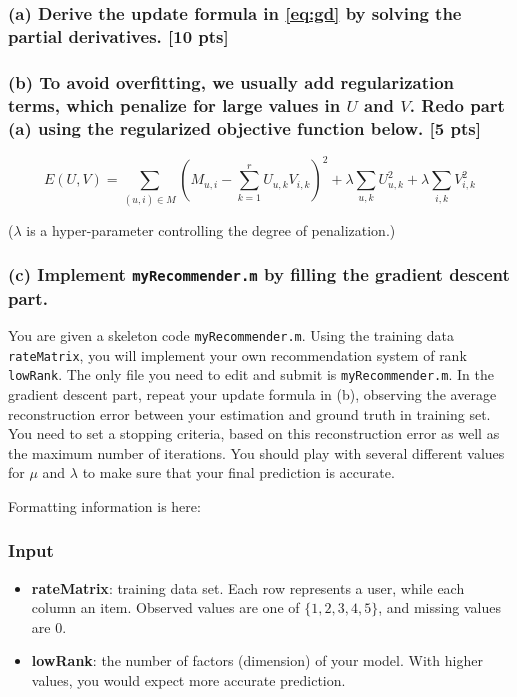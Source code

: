 \documentclass[twoside,10pt]{article}
\begin{document}
\subsubsection*{(a) Derive the update formula in \eqref{eq:gd} by
solving the partial derivatives. [10 pts]}

\subsubsection*{(b) To avoid overfitting, we usually add regularization terms, which penalize for large values in $U$ and $V$.
Redo part (a) using the regularized objective function below. [5
pts]}

\begin{equation}
E(U,V) = \sum_{(u, i) \in M} (M_{u,i} - \sum_{k=1}^r U_{u,k}
V_{i,k})^2 + \lambda \sum_{u,k} U_{u,k}^2 + \lambda \sum_{i,k}
V_{i,k}^2 \nonumber
\end{equation}

($\lambda$ is a hyper-parameter controlling the degree of
penalization.)

\subsubsection*{(c) Implement \texttt{myRecommender.m} by filling the gradient descent part.}

You are given a skeleton code \texttt{myRecommender.m}. Using the
training data \texttt{rateMatrix}, you will implement your own
recommendation system of rank \texttt{lowRank}. The only file you
need to edit and submit is \texttt{myRecommender.m}. In the gradient descent
part, repeat your update formula in (b), observing the average
reconstruction error between your estimation and ground truth in
training set. You need to set a stopping criteria, based on this
reconstruction error as well as the maximum number of iterations.
You should play with several different values for $\mu$ and
$\lambda$ to make sure that your final prediction is accurate.

Formatting information is here:

\subsubsection*{Input}
\begin{itemize}
  \item \textbf{rateMatrix}: training data set. Each row represents a user, while each column an item.
  Observed values are one of $\{1,2,3,4,5\}$, and missing values are
  0.
  \item \textbf{lowRank}: the number of factors (dimension) of your
  model. With higher values, you would expect more accurate
  prediction.
\end{itemize}
\end{document}
